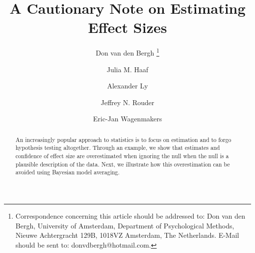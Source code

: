 \documentclass[a4paper]{article}
\title{A Cautionary Note on Estimating Effect Sizes}
\author[1]{Don van den Bergh%
	\thanks{Correspondence concerning this article should be addressed to: Don van den Bergh, University of Amsterdam, Department of Psychological Methods, Nieuwe Achtergracht 129B, 1018VZ Amsterdam, The Netherlands. E-Mail should be sent to: donvdbergh@hotmail.com.
}}
\author[1]{Julia M. Haaf}
\author[1,2]{Alexander Ly}
\author[3]{\authorcr Jeffrey N. Rouder} %
\author[1]{Eric-Jan Wagenmakers}
\affil[1]{University of Amsterdam}
\affil[2]{Centrum Wiskunde \& Informatica}
\affil[3]{University of California Irvine}
\date{}
\begin{document}
\tbEffectSizeExample
{}\reanalysis

\listoftodos
\newpage

\maketitle

\begin{abstract}
	An increasingly popular approach to statistics is to focus on estimation and to forgo hypothesis testing altogether. Through an example, we show that estimates and confidence of effect size are overestimated when ignoring the null when the null is a plausible description of the data. Next, we illustrate how this overestimation can be avoided using Bayesian model averaging. %
\end{abstract}
\end{document}
